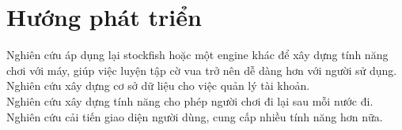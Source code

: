 \section{Hướng phát triển}
Nghiên cứu áp dụng lại stockfish hoặc một engine khác để xây dựng tính năng chơi với máy, giúp việc luyện tập cờ vua trở nên dễ dàng hơn với người sử dụng.\\
Nghiên cứu xây dựng cơ sở dữ liệu cho việc quản lý tài khoản.\\
Nghiên cứu xây dựng tính năng cho phép người chơi đi lại sau mỗi nước đi.\\
Nghiên cứu cải tiến giao diện người dùng, cung cấp nhiều tính năng hơn nữa.